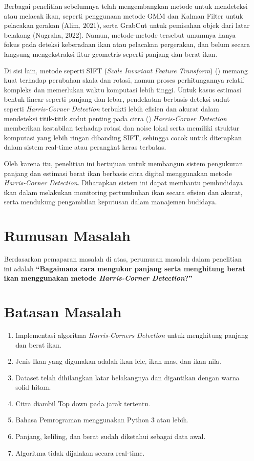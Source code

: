 Berbagai penelitian sebelumnya telah mengembangkan metode untuk mendeteksi atau melacak ikan, seperti penggunaan metode GMM dan Kalman Filter untuk pelacakan gerakan (Alim, 2021), serta GrabCut untuk pemisahan objek dari latar belakang (Nugraha, 2022). Namun, metode-metode tersebut umumnya hanya fokus pada deteksi keberadaan ikan atau pelacakan pergerakan, dan belum secara langsung mengekstraksi fitur geometris seperti panjang dan berat ikan.

Di sisi lain, metode seperti SIFT (\emph{Scale Invariant Feature Transform}) (\cite{Lowe2004}) memang kuat terhadap perubahan skala dan rotasi, namun proses perhitungannya relatif kompleks dan memerlukan waktu komputasi lebih tinggi. Untuk kasus estimasi bentuk linear seperti panjang dan lebar, pendekatan berbasis deteksi sudut seperti \emph{Harris-Corner Detection} terbukti lebih efisien dan akurat dalam mendeteksi titik-titik sudut penting pada citra (\cite{Harris2013}).\emph{Harris-Corner Detection} memberikan kestabilan terhadap rotasi dan noise lokal serta memiliki struktur komputasi yang lebih ringan dibanding SIFT, sehingga cocok untuk diterapkan dalam sistem real-time atau perangkat keras terbatas.

Oleh karena itu, penelitian ini bertujuan untuk membangun sistem pengukuran panjang dan estimasi berat ikan berbasis citra digital menggunakan metode \emph{Harris-Corner Detection}. Diharapkan sistem ini dapat membantu pembudidaya ikan dalam melakukan monitoring pertumbuhan ikan secara efisien dan akurat, serta mendukung pengambilan keputusan dalam manajemen budidaya.

\section{Rumusan Masalah}
Berdasarkan pemaparan masalah di atas, perumusan masalah dalam penelitian ini adalah \textbf{“Bagaimana cara mengukur panjang serta menghitung berat ikan menggunakan metode \emph{Harris-Corner Detection}?”}

\section{Batasan Masalah}
\begin{enumerate}
	\item Implementasi algoritma \emph{Harris-Corners Detection} untuk menghitung panjang dan berat ikan. 
	\item Jenis Ikan yang digunakan adalah ikan lele, ikan mas, dan ikan nila.
	\item Dataset telah dihilangkan latar belakangnya dan digantikan dengan warna solid hitam.
	\item Citra diambil Top down pada jarak tertentu. 
	\item Bahasa Pemrograman menggunakan Python 3 atau lebih. 
    \item Panjang, keliling, dan berat sudah diketahui sebagai data awal.
    \item Algoritma tidak dijalakan secara real-time.
\end{enumerate}
	
